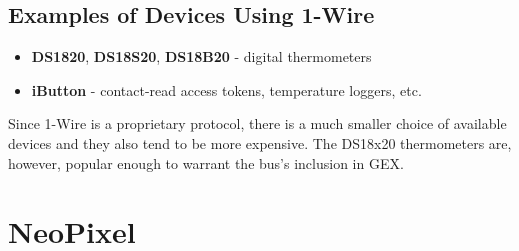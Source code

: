 \subsection{Examples of Devices Using 1-Wire}

\begin{itemize}
	\item \textbf{DS1820}, \textbf{DS18S20}, \textbf{DS18B20} - digital thermometers
	\item \textbf{iButton} - contact-read access tokens, temperature loggers, etc.
\end{itemize}

Since 1-Wire is a proprietary protocol, there is a much smaller choice of available devices and they also tend to be more expensive. The DS18x20 thermometers are, however, popular enough to warrant the bus's inclusion in GEX.

\section{NeoPixel} \label{sec:theory-neo}

